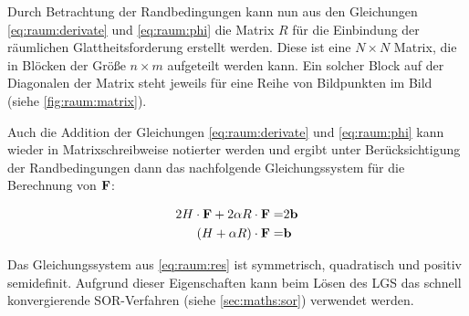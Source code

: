 Durch Betrachtung der Randbedingungen kann nun aus den Gleichungen \ref{eq:raum:derivate} und \ref{eq:raum:phi} die Matrix $R$ für die Einbindung der räumlichen Glattheitsforderung erstellt werden. Diese ist eine $N \times N$ Matrix, die in Blöcken der Größe $n \times m$ aufgeteilt werden kann. Ein solcher Block auf der Diagonalen der Matrix  steht jeweils für eine Reihe von Bildpunkten im Bild (siehe \autoref{fig:raum:matrix}). 

Auch die Addition der Gleichungen \ref{eq:raum:derivate} und \ref{eq:raum:phi} kann wieder in Matrixschreibweise notierter werden und ergibt unter Berücksichtigung der Randbedingungen dann das nachfolgende Gleichungssystem für die Berechnung von $\mathbf F$: 

\begin{align}
2 H \cdot \mathbf F + 2 \alpha R\cdot \mathbf F =& 2 \mathbf b \\
\label{eq:raum:res}
(H+\alpha R)\cdot \mathbf F =& \mathbf b
\end{align}

Das Gleichungssystem aus \ref{eq:raum:res} ist symmetrisch, quadratisch und positiv semidefinit. Aufgrund dieser Eigenschaften kann beim Lösen des \gls{LGS} das schnell konvergierende SOR-Verfahren (siehe \autoref{sec:maths:sor}) verwendet werden. 

